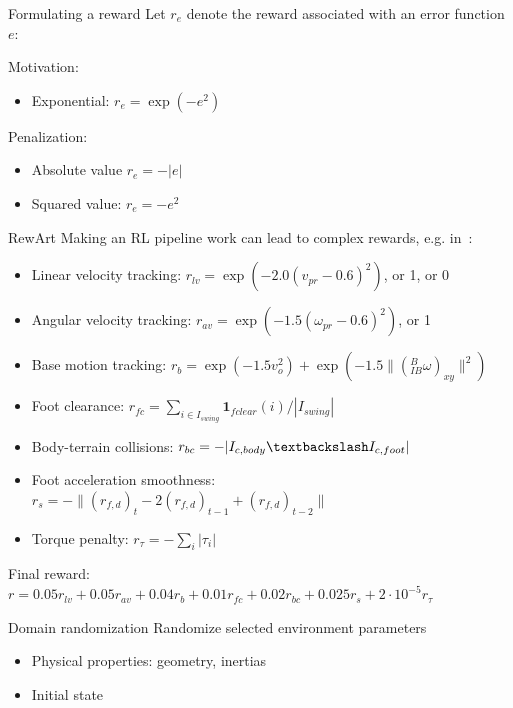 \documentclass[11pt, aspectratio=169]{beamer}
\begin{document}
\begin{frame}{Formulating a reward}
    Let $r_e$ denote the reward associated with an error function $e$:

    Motivation:
    \begin{itemize}
        \item Exponential: $r_e = \exp(-e^2)$
    \end{itemize}

    Penalization:
    \begin{itemize}
        \item Absolute value $r_e = -|e|$
        \item Squared value: $r_e = -e^2$
    \end{itemize}
\end{frame}

\begin{frame}{RewArt}
    Making an RL pipeline work can lead to complex rewards, e.g. in~\cite{lee2020}:
    \begin{itemize}
        \item Linear velocity tracking: $r_{lv} = \exp(-2.0 (v_{pr} - 0.6)^2)$, or 1, or 0
        \item Angular velocity tracking: $r_{av} = \exp(-1.5 (\omega_{pr} - 0.6)^2)$, or 1
        \item Base motion tracking: $r_b = \exp(-1.5v_o^2) + \exp(-1.5 \|({}^B_{IB} \omega)_{xy}\|^2)$
        \item Foot clearance: $r_{fc} = \sum_{i \in I_{swing}} \mathbf{1}_{fclear}(i) / |I_{swing}|$
        \item Body-terrain collisions: $r_{bc} = -|I_{c,body} \textbackslash I_{c,foot}|$
        \item Foot acceleration smoothness: $r_{s} = -\| (r_{f,d})_t - 2(r_{f,d})_{t-1} + (r_{f,d})_{t-2}\|$
        \item Torque penalty: $r_{\tau} = -\sum_{i} | \tau_i |$
    \end{itemize}
    Final reward: $r = 0.05 r_{lv} + 0.05 r_{av} + 0.04 r_b + 0.01 r_{fc} + 0.02 r_{bc} + 0.025 r_s + 2 \cdot 10^{-5} r_{\tau}$
\end{frame}

\begin{frame}{Domain randomization}
    Randomize selected environment parameters
    \begin{itemize}
        \item Physical properties: geometry, inertias
        \item Initial state
    \end{itemize}
\end{frame}
\end{document}
